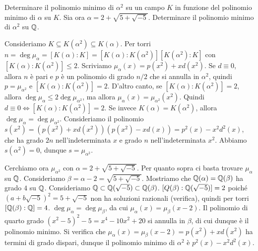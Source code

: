 \begin{exercise}
    Determinare il polinomio minimo di $\alpha^2$ su un campo $K$ in funzione del polinomio minimo di $\alpha$ su $K$. Sia ora $\alpha = 2 + \sqrt{5 + \sqrt{-5}}$. Determinare il polinomio minimo di $\alpha^2$ su $\mathbb{Q}$.
\end{exercise}
\begin{solution}
    Consideriamo $K \subseteq K(\alpha^2) \subseteq K(\alpha)$. Per torri $n = \deg \mu_\alpha = [K(\alpha) : K] = [K(\alpha) : K(\alpha^2)][K(\alpha^2) : K]$ con $[K(\alpha) : K(\alpha^2)] \le 2$. Scriviamo $\mu_\alpha(x) = p(x^2) + x d(x^2)$. Se $d \equiv 0$, allora $n$ è pari e $p$ è un polinomio di grado $n / 2$ che si annulla in $\alpha^2$, quindi $p = \mu_{\alpha^2}$ e $[K(\alpha) : K(\alpha^2)] = 2$. D'altro canto, se $[K(\alpha) : K(\alpha^2)] = 2$, allora $\deg \mu_\alpha \le 2 \deg \mu_{\alpha^2}$, ma allora $\mu_\alpha(x) = \mu_{\alpha^2}(x^2)$. Quindi $d \equiv 0 \iff [K(\alpha) : K(\alpha^2)] = 2$. Se invece $K(\alpha) = K(\alpha^2)$, allora $\deg \mu_\alpha = \deg \mu_{\alpha^2}$. Consideriamo il polinomio $s(x^2) = (p(x^2) + xd(x^2))(p(x^2) - xd(x)) = p^2(x) - x^2 d^2(x)$, che ha grado $2n$ nell'indeterminata $x$ e grado $n$ nell'indeterminata $x^2$. Abbiamo $s(\alpha^2) = 0$, dunque $s = \mu_{\alpha^2}$.

    Cerchiamo ora $\mu_{\alpha^2}$ con $\alpha = 2 + \sqrt{5 + \sqrt{-5}}$. Per quanto sopra ci basta trovare $\mu_\alpha$ su $\mathbb{Q}$. Consideriamo $\beta = \alpha - 2 = \sqrt{5 + \sqrt{-5}}$.
    Mostriamo che $\mathbb{Q}(\alpha) = \mathbb{Q}(\beta)$ ha grado $4$ su $\mathbb{Q}$. Consideriamo $\mathbb{Q} \subset \mathbb{Q}(\sqrt{-5}) \subset \mathbb{Q}(\beta)$. $[Q(\beta) : \mathbb{Q}(\sqrt{-5})] = 2$ poiché $(a + b \sqrt{-5})^2 = 5 + \sqrt{-5}$ non ha soluzioni razionali (verifica), quindi per torri $[\mathbb{Q}(\beta) : \mathbb{Q}] = 4$.
    $\deg \mu_\alpha = \deg \mu_\beta$, da cui $\mu_\alpha(x) = \mu_\beta(x - 2)$. Il polinomio di quarto grado $(x^2 - 5)^2 - 5 = x^4 - 10x^2 + 20$ si annulla in $\beta$, di cui dunque è il polinomio minimo. Si verifica che $\mu_\alpha(x) = \mu_\beta(x - 2) = p(x^2) + xd(x^2)$ ha termini di grado dispari, dunque il polinomio minimo di $\alpha^2$ è $p^2(x) - x^2d^2(x)$.
\end{solution}

